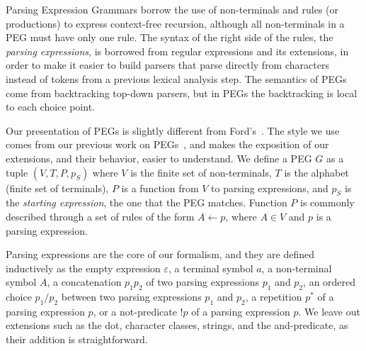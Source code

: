 Parsing Expression Grammars borrow the use of non-terminals and rules
(or productions) to express context-free recursion, although all
non-terminals in a PEG must have only one rule. The syntax of the
right side of the rules, the {\em parsing expressions}, is borrowed
from regular expressions and its extensions, in order to make it
easier to build parsers that parse directly from characters instead of
tokens from a previous lexical analysis step. The semantics of PEGs
come from backtracking top-down parsers, but in PEGs the backtracking
is local to each choice point.

Our presentation of PEGs is slightly different from
Ford's~\cite{ford:peg}. The style we use comes from
our previous work on PEGs~\cite{dls:lpeg,sblp:repeg},
and makes the exposition of
our extensions, and their behavior, easier to understand.
We define a PEG $G$ as a tuple $(V, T, P, p_S)$ where $V$ is the finite
set of non-terminals, $T$ is the alphabet (finite set of terminals),
$P$ is a function from $V$ to parsing expressions, and $p_S$ is the
{\em starting expression}, the one that the PEG matches. 
Function $P$ is commonly described through a set of rules
of the form $A \leftarrow p$, where $A \in V$ and $p$ is a
parsing expression.

Parsing expressions are the core of our
formalism, and they are defined inductively as the empty expression
$\varepsilon$, a terminal symbol $a$, a non-terminal symbol $A$, a
concatenation $p_1p_2$ of two parsing expressions $p_1$ and $p_2$, an
ordered choice $p_1 / p_2$ between two parsing expressions $p_1$ and
$p_2$, a repetition $p^*$ of a parsing expression $p$, or a
not-predicate $!p$ of a parsing expression $p$. We leave out
extensions such as the dot, character classes, strings, and the
and-predicate, as their addition is straightforward. 

